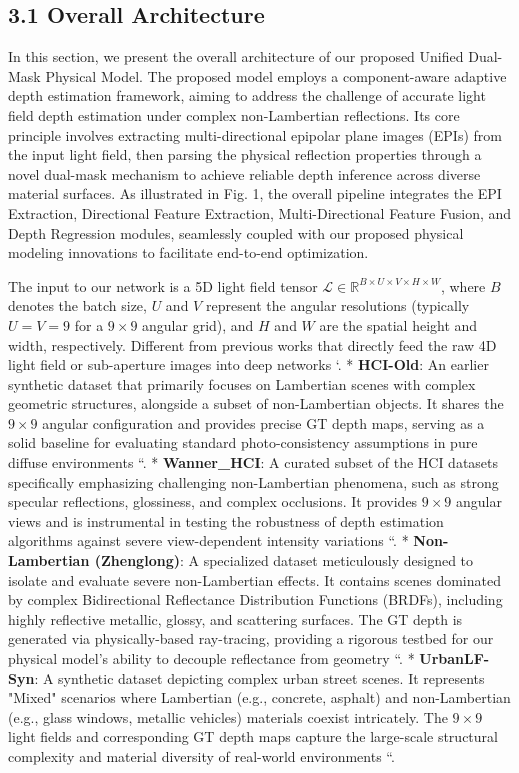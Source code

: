 \documentclass[journal]{IEEEtran}
\begin{document}
\subsection{3.1 Overall Architecture}

In this section, we present the overall architecture of our proposed Unified Dual-Mask Physical Model. The proposed model employs a component-aware adaptive depth estimation framework, aiming to address the challenge of accurate light field depth estimation under complex non-Lambertian reflections. Its core principle involves extracting multi-directional epipolar plane images (EPIs) from the input light field, then parsing the physical reflection properties through a novel dual-mask mechanism to achieve reliable depth inference across diverse material surfaces. As illustrated in Fig. 1, the overall pipeline integrates the EPI Extraction, Directional Feature Extraction, Multi-Directional Feature Fusion, and Depth Regression modules, seamlessly coupled with our proposed physical modeling innovations to facilitate end-to-end optimization.

The input to our network is a 5D light field tensor \(\mathcal{L} \in \mathbb{R}^{B \times U \times V \times H \times W}\), where \(B\) denotes the batch size, \(U\) and \(V\) represent the angular resolutions (typically \(U=V=9\) for a \(9 \times 9\) angular grid), and \(H\) and \(W\) are the spatial height and width, respectively. Different from previous works that directly feed the raw 4D light field or sub-aperture images into deep networks `.
*   \textbf{HCI-Old}: An earlier synthetic dataset that primarily focuses on Lambertian scenes with complex geometric structures, alongside a subset of non-Lambertian objects. It shares the \(9 \times 9\) angular configuration and provides precise GT depth maps, serving as a solid baseline for evaluating standard photo-consistency assumptions in pure diffuse environments ``.
*   \textbf{Wanner_HCI}: A curated subset of the HCI datasets specifically emphasizing challenging non-Lambertian phenomena, such as strong specular reflections, glossiness, and complex occlusions. It provides \(9 \times 9\) angular views and is instrumental in testing the robustness of depth estimation algorithms against severe view-dependent intensity variations ``.
*   \textbf{Non-Lambertian (Zhenglong)}: A specialized dataset meticulously designed to isolate and evaluate severe non-Lambertian effects. It contains scenes dominated by complex Bidirectional Reflectance Distribution Functions (BRDFs), including highly reflective metallic, glossy, and scattering surfaces. The GT depth is generated via physically-based ray-tracing, providing a rigorous testbed for our physical model's ability to decouple reflectance from geometry ``.
*   \textbf{UrbanLF-Syn}: A synthetic dataset depicting complex urban street scenes. It represents "Mixed" scenarios where Lambertian (e.g., concrete, asphalt) and non-Lambertian (e.g., glass windows, metallic vehicles) materials coexist intricately. The \(9 \times 9\) light fields and corresponding GT depth maps capture the large-scale structural complexity and material diversity of real-world environments ``.
\end{document}
